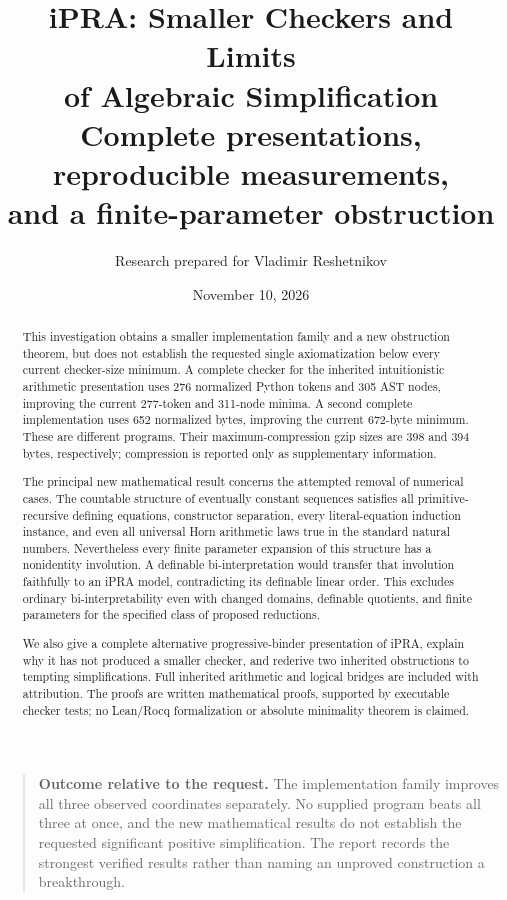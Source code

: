 \documentclass[11pt,letterpaper]{article}
\title{\textbf{iPRA: Smaller Checkers and Limits\\of Algebraic Simplification}\\[0.5em]
\large Complete presentations, reproducible measurements,\\and a finite-parameter obstruction}
\author{Research prepared for Vladimir Reshetnikov}
\date{November 10, 2026}
\theoremstyle{definition}\newtheorem{definition}[theorem]{Definition}
\theoremstyle{remark}\newtheorem{remark}[theorem]{Remark}
\begin{document}
\maketitle
\begin{abstract}
This investigation obtains a smaller implementation family and a new
obstruction theorem, but does not establish the requested single
axiomatization below every current checker-size minimum. A complete
checker for the inherited intuitionistic arithmetic presentation uses
276 normalized Python tokens and 305 AST nodes, improving the current
277-token and 311-node minima. A second complete implementation uses
652 normalized bytes, improving the current 672-byte minimum. These
are different programs. Their maximum-compression gzip sizes are
398 and 394 bytes, respectively; compression is reported only as
supplementary information.

The principal new mathematical result concerns the attempted removal
of numerical cases. The countable structure of eventually constant
sequences satisfies all primitive-recursive defining equations,
constructor separation, every literal-equation induction instance,
and even all universal Horn arithmetic laws true in the standard
natural numbers. Nevertheless every finite parameter expansion of
this structure has a nonidentity involution. A definable
bi-interpretation would transfer that involution faithfully to an
iPRA model, contradicting its definable linear order. This excludes
ordinary bi-interpretability even with changed domains, definable
quotients, and finite parameters for the specified class of proposed
reductions.

We also give a complete alternative progressive-binder presentation
of iPRA, explain why it has not produced a smaller checker, and rederive
two inherited obstructions to tempting simplifications. Full inherited
arithmetic and logical bridges are included with attribution. The
proofs are written mathematical proofs, supported by executable
checker tests; no Lean/Rocq formalization or absolute minimality
theorem is claimed.
\end{abstract}
\begin{quote}
\textbf{Outcome relative to the request.} The implementation family
improves all three observed coordinates separately. No supplied
program beats all three at once, and the new mathematical results
do not establish the requested significant positive simplification.
The report records the strongest verified results rather than naming
an unproved construction a breakthrough.
\end{quote}
\clearpage
\setcounter{tocdepth}{2}\tableofcontents
\clearpage
\end{document}
